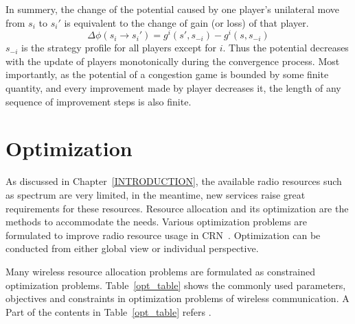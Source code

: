 In summery, the change of the potential caused by one player's unilateral move from $s_i$ to $s_i'$ is equivalent to the change of gain (or loss) of that player.
\begin{equation}
\label{5}
\varDelta \phi(s_i \rightarrow s_i') = g^i(s',s_{-i}) - g^i(s,s_{-i})
\end{equation}
$s_{-i}$ is the strategy profile for all players except for $i$.
Thus the potential decreases with the update of players monotonically during the convergence process.
Most importantly, as the potential of a congestion game is bounded by some finite quantity, and every improvement made by player decreases it, the length of any sequence of improvement steps is also finite.







\section{Optimization}
As discussed in Chapter~\ref{INTRODUCTION}, the available radio resources such as spectrum are very limited, in the meantime, new services raise great requirements for these resources.
Resource allocation and its optimization are the methods to accommodate the needs.
Various optimization problems are formulated to improve radio resource usage in CRN~\cite{cacao_ca_2011, fuzzy_decision_09, resourceAllocation_imperfectSensing_2012}.
Optimization can be conducted from either global view or individual perspective.

Many wireless resource allocation problems are formulated as constrained optimization problems.
Table~\ref{opt_table} shows the commonly used parameters, objectives and constraints in optimization problems of wireless communication.
A Part of the contents in Table~\ref{opt_table} refers \cite{Han:2008:RAW:1457343}.

